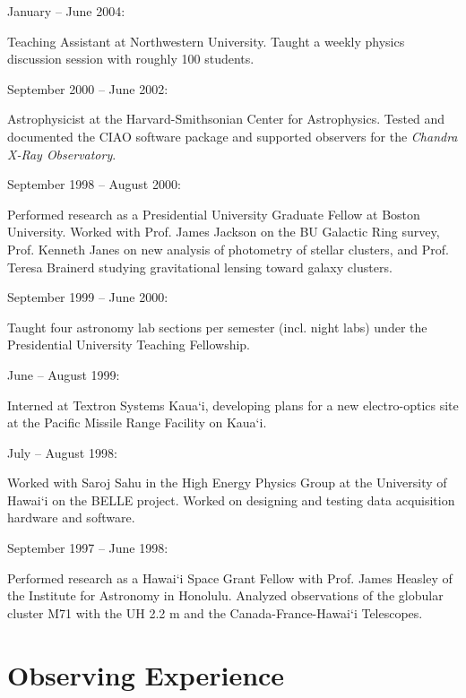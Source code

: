 \documentclass[12pt]{article}
\begin{document}
\begin{bf}January -- June 2004:  \end{bf}Teaching Assistant at Northwestern University.  Taught a weekly physics discussion session with roughly 100 students.

\begin{bf}September 2000 -- June 2002:  \end{bf}Astrophysicist at the Harvard-Smithsonian Center for Astrophysics.  Tested and documented the CIAO software package and supported observers for the \emph{Chandra X-Ray Observatory}.

\begin{bf}September 1998 -- August 2000:  \end{bf}Performed research as a Presidential University Graduate Fellow at Boston University.  Worked with Prof. James Jackson on the BU Galactic Ring survey, Prof. Kenneth Janes on new analysis of photometry of stellar clusters, and Prof. Teresa Brainerd studying gravitational lensing toward galaxy clusters.

\begin{bf}September 1999 -- June 2000:  \end{bf}Taught four astronomy lab sections per semester (incl. night labs) under the Presidential University Teaching Fellowship.

\begin{bf}June -- August 1999:  \end{bf}Interned at Textron Systems Kaua`i, developing plans for a new electro-optics site at the Pacific Missile Range Facility on Kaua`i.

\begin{bf}July -- August 1998:  \end{bf}Worked with Saroj Sahu in the High Energy Physics Group at the University of Hawai`i on the BELLE project.  Worked on designing and testing data acquisition hardware and software.

\begin{bf}September 1997 -- June 1998:  \end{bf}Performed research as a Hawai`i Space Grant Fellow with Prof. James Heasley of the Institute for Astronomy in Honolulu.  Analyzed observations of the globular cluster M71 with the UH 2.2 m and the Canada-France-Hawai`i Telescopes.

\section{Observing Experience}
\indent
\end{document}
